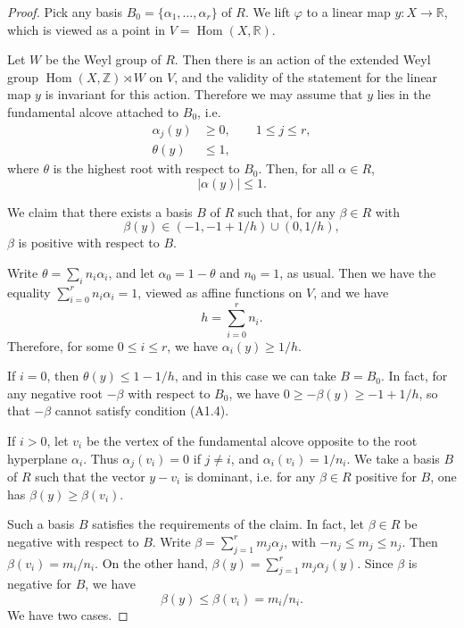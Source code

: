 \documentclass[11pt]{article}
\begin{document}
\begin{proof}
Pick any basis \(B_0=\{\alpha_1,\ldots,\alpha_r\}\) of \(R\). We lift \(\varphi\) to a linear
map \(y:X\to\mathbb R\), which is viewed as a point in \(V=\operatorname{Hom}(X,\mathbb R)\).

Let \(W\) be the Weyl group of \(R\). Then there is an action of the extended Weyl group
\(\operatorname{Hom}(X,\mathbb Z)\rtimes W\) on \(V\), and the validity of the statement for
the linear map \(y\) is invariant for this action. Therefore we may assume that \(y\) lies in
the fundamental alcove attached to \(B_0\), i.e.
\begin{align}
  \alpha_j(y)&\ge 0,\qquad 1\le j\le r, \tag{A1.1}\\
  \theta(y)&\le 1, \tag{A1.2}
\end{align}
where \(\theta\) is the highest root with respect to \(B_0\). Then, for all \(\alpha\in R\),
\begin{equation}
  |\alpha(y)|\le 1.
  \tag{A1.3}
\end{equation}

We claim that there exists a basis \(B\) of \(R\) such that, for any \(\beta\in R\) with
\begin{equation}
  \beta(y)\in (-1,-1+1/h)\cup(0,1/h),
  \tag{A1.4}
\end{equation}
\(\beta\) is positive with respect to \(B\).

Write \(\theta=\sum_i n_i\alpha_i\), and let \(\alpha_0=1-\theta\) and \(n_0=1\), as usual.
Then we have the equality \(\sum_{i=0}^r n_i\alpha_i=1\), viewed as affine functions on \(V\),
and we have
\begin{equation}
  h=\sum_{i=0}^r n_i.
  \tag{A1.5}
\end{equation}
Therefore, for some \(0\le i\le r\), we have \(\alpha_i(y)\ge 1/h\).

If \(i=0\), then \(\theta(y)\le 1-1/h\), and in this case we can take \(B=B_0\). In fact, for
any negative root \(-\beta\) with respect to \(B_0\), we have
\(0\ge -\beta(y)\ge -1+1/h\), so that \(-\beta\) cannot satisfy condition (A1.4).

If \(i>0\), let \(v_i\) be the vertex of the fundamental alcove opposite to the root
hyperplane \(\alpha_i\). Thus \(\alpha_j(v_i)=0\) if \(j\ne i\), and
\(\alpha_i(v_i)=1/n_i\). We take a basis \(B\) of \(R\) such that the vector \(y-v_i\) is
dominant, i.e. for any \(\beta\in R\) positive for \(B\), one has \(\beta(y)\ge\beta(v_i)\).

Such a basis \(B\) satisfies the requirements of the claim. In fact, let \(\beta\in R\) be
negative with respect to \(B\). Write \(\beta=\sum_{j=1}^r m_j\alpha_j\), with
\(-n_j\le m_j\le n_j\). Then \(\beta(v_i)=m_i/n_i\). On the other hand,
\(\beta(y)=\sum_{j=1}^r m_j\alpha_j(y)\). Since \(\beta\) is negative for \(B\), we have
\begin{equation}
  \beta(y)\le \beta(v_i)=m_i/n_i.
  \tag{A1.6}
\end{equation}
We have two cases.


\end{proof}
\end{document}
